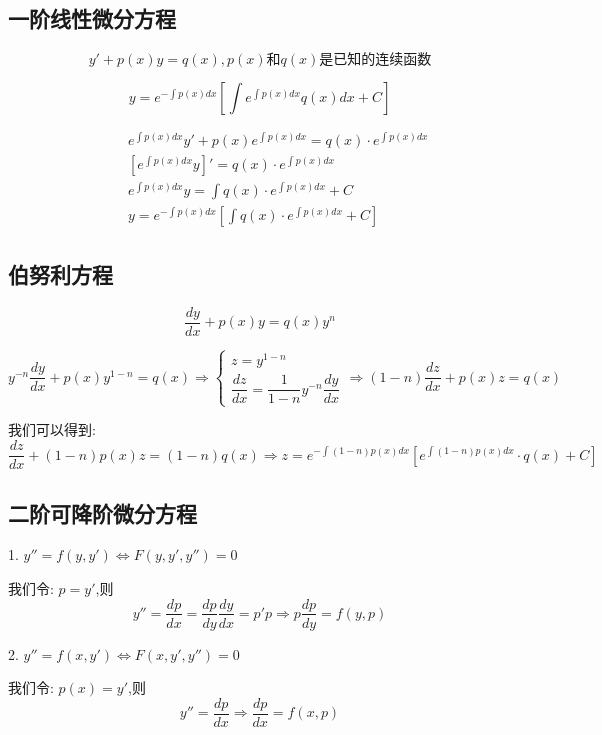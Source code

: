 \subsection{一阶线性微分方程}\label{def: 一阶线性微分方程公式}
\begin{definition}[一阶线性微分方程]
	$$y'+p(x)y=q(x), p(x)\text{和} q(x)\text{是已知的连续函数}$$
\end{definition}
\begin{theorem}[一阶线性微分方程解]
	$$y=e^{-\int p(x)dx}\left[\int e^{\int p(x)dx}q(x)dx+C\right]$$
	\begin{anymark}[注]
		\begin{eqnarray*}
			&\quad & e^{\int p(x)dx}y' + p(x)e^{\int p(x)dx} = q(x)\cdot e^{\int p(x)dx}\\
			&\quad & \left[e^{\int p(x)dx}y\right]' = q(x)\cdot e^{\int p(x)dx}\\
			&\quad & e^{\int p(x)dx}y = \int q(x)\cdot e^{\int p(x)dx} + C\\
			&\quad & y = e^{-\int p(x)dx}\left[\int q(x)\cdot e^{\int p(x)dx} + C\right]
		\end{eqnarray*}
	\end{anymark}
\end{theorem}

\subsection{伯努利方程}
\begin{definition}[伯努利方程]\label{def: 伯努利方程}
	$$\dfrac{dy}{dx}+p(x)y=q(x)y^{n}$$
\end{definition}
\begin{theorem}
	$$y^{-n}\dfrac{dy}{dx} +p(x)y^{1-n} = q(x)\Rightarrow
	\begin{cases}
		z = y^{1-n}\\
		\dfrac{dz}{dx} = \dfrac{1}{1-n}y^{-n}\dfrac{dy}{dx}
	\end{cases}\Rightarrow (1-n)\dfrac{dz}{dx} + p(x)z =q(x)$$

	我们可以得到: 
	$$\dfrac{dz}{dx} + (1-n)p(x)z = (1-n)q(x)\Rightarrow z = e^{-\int (1-n)p(x)dx}\left[ e^{\int (1-n)p(x)dx}\cdot q(x)+ C \right]$$
\end{theorem}

\subsection{二阶可降阶微分方程}
\begin{definition}[二阶可降阶微分方程]

	1. $y''=f(y,y')\Leftrightarrow F(y,y',y'') = 0$

	我们令:  $p=y'$,则 
	$$y''=\frac{dp}{dx}=\frac{dp}{dy}\frac{dy}{dx}=p'p \Rightarrow p\dfrac{dp}{dy} = f(y,p)$$

	2. $y''=f(x,y')\Leftrightarrow F(x,y',y'') = 0$

	我们令:  $p(x)=y'$,则
	$$y''=\frac{dp}{dx}\Rightarrow \dfrac{dp}{dx} = f(x,p)$$
\end{definition}
